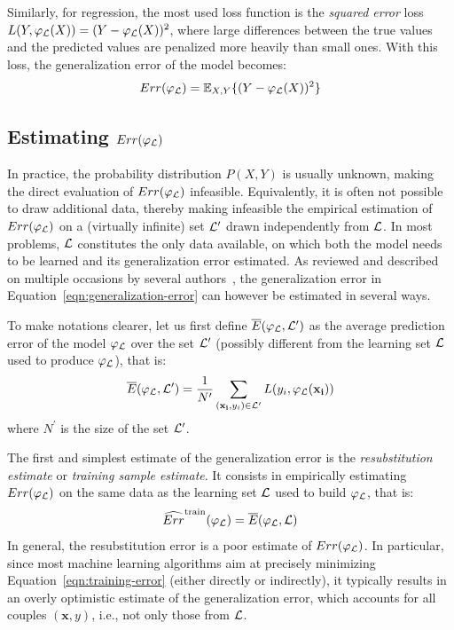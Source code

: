 Similarly, for regression, the most used loss function is the \textit{squared
error} loss $L(Y, \varphi_{\cal L}(X)) = (Y - \varphi_{\cal L}(X))^2$, where large differences
between the true values and the predicted values are penalized more heavily
than small ones. With this loss, the generalization error of the model becomes:
\begin{equation}
Err(\varphi_{\cal L}) = \mathbb{E}_{X, Y}\{ (Y - \varphi_{\cal L}(X))^2  \}
\end{equation}

\subsection{Estimating $Err(\varphi_{\cal L})$}
\label{sec:2:estimating-generalization-error}

In practice, the probability distribution $P(X, Y)$ is usually unknown, making
the direct evaluation of $Err(\varphi_{\cal L})$ infeasible. Equivalently, it
is often not possible to draw additional data, thereby making infeasible the
empirical estimation of $Err(\varphi_{\cal L})$ on a (virtually infinite) set
${\cal L}'$ drawn independently from ${\cal L}$. In most problems, ${\cal L}$
constitutes the only data available, on which both the model needs to be
learned and its generalization error estimated. As reviewed and described on
multiple occasions by several
authors~\citep{toussaint:1974,stone:1978,breiman:1984,kohavi:1995,nadeau:2003,hastie:2005,arlot:2010},
the generalization error in Equation~\ref{eqn:generalization-error} can however
be estimated in several ways.

To make notations clearer, let us first define $\overline{E}(\varphi_{\cal L}, {\cal
L}^\prime)$ as the average prediction error of the model $\varphi_{\cal L}$ over the set
${\cal L}^\prime$ (possibly different from the learning set ${\cal L}$ used to produce
$\varphi_{\cal L}$), that is:
\begin{equation}
\overline{E}(\varphi_{\cal L}, {\cal L}^\prime) = \frac{1}{N^\prime} \sum_{(\mathbf{x_i}, y_i) \in {\cal L}^\prime} L(y_i, \varphi_{\cal L}(\mathbf{x_i}))
\end{equation}
where $N^\prime$ is the size of the set ${\cal L}^\prime$.

The first and simplest estimate of the generalization error is the
\textit{resubstitution estimate} or \textit{training sample estimate}. It
consists in empirically estimating $Err(\varphi_{\cal L})$ on the same data as
the learning set ${\cal L}$ used to build $\varphi_{\cal L}$, that is:
\begin{equation}\label{eqn:training-error}
\widehat{Err}^\text{train}(\varphi_{\cal L}) = \overline{E}(\varphi_{\cal L}, {\cal L})
\end{equation}
In general, the resubstitution error is a poor estimate of $Err(\varphi_{\cal L})$.
In particular, since most machine learning algorithms aim at
precisely minimizing Equation~\ref{eqn:training-error} (either directly or
indirectly), it typically results in an overly optimistic estimate of the
generalization error, which accounts for all couples $(\mathbf{x}, y)$, i.e.,
not only those from ${\cal L}$.

